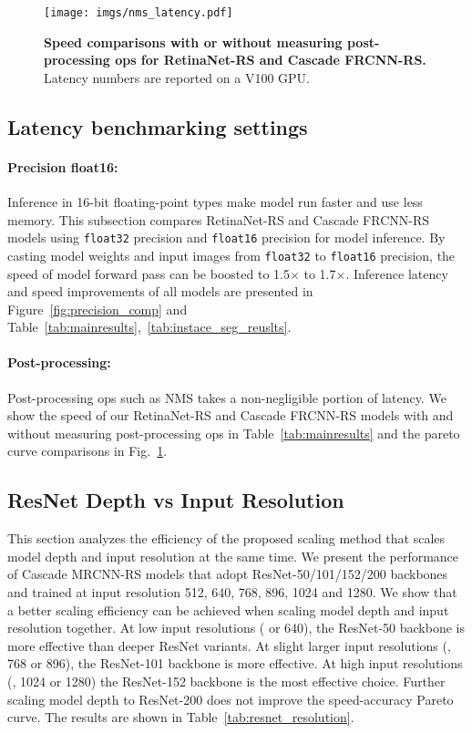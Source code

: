 \documentclass[final]{cvpr}
\begin{document}
\begin{figure}[!h]
    \texttt{[image: imgs/nms\_latency.pdf]}
    \caption{\textbf{Speed comparisons with or without measuring post-processing ops for RetinaNet-RS and Cascade FRCNN-RS.} Latency numbers are reported on a V100 GPU.}
\label{fig:nms_comp}
\vspace{-0mm}
\end{figure}

\subsection{Latency benchmarking settings}
\paragraph{Precision float16:} Inference in 16-bit floating-point types make model run faster and use less memory. This subsection compares RetinaNet-RS and Cascade FRCNN-RS models using \texttt{float32} precision and \texttt{float16} precision for model inference. By casting model weights and input images from \texttt{float32} to \texttt{float16} precision, the speed of model forward pass can be boosted to 1.5$\times$ to 1.7$\times$. Inference latency and speed improvements of all models are presented in Figure~\ref{fig:precision_comp} and Table~\ref{tab:mainresults},~\ref{tab:instace_seg_reuslts}.
\paragraph{Post-processing:} Post-processing ops such as NMS takes a non-negligible portion of latency. We show the speed of our RetinaNet-RS and Cascade FRCNN-RS models with and without measuring post-processing ops in Table~\ref{tab:mainresults} and the pareto curve comparisons in Fig.~\ref{fig:nms_comp}.

\subsection{ResNet Depth vs Input Resolution}
This section analyzes the efficiency of the proposed scaling method that scales model depth and input resolution at the same time. We present the performance of Cascade MRCNN-RS models that adopt ResNet-50/101/152/200 backbones and trained at input resolution 512, 640, 768, 896, 1024 and 1280. We show that a better scaling efficiency can be achieved when scaling model depth and input resolution together. At low input resolutions ( or 640), the ResNet-50 backbone is more effective than deeper ResNet variants. At slight larger input resolutions (\ie, 768 or 896), the ResNet-101 backbone is more effective. At high input resolutions (\ie, 1024 or 1280) the ResNet-152 backbone is the most effective choice. Further scaling model depth to ResNet-200 does not improve the speed-accuracy Pareto curve. The results are shown in Table~\ref{tab:resnet_resolution}.
\end{document}
